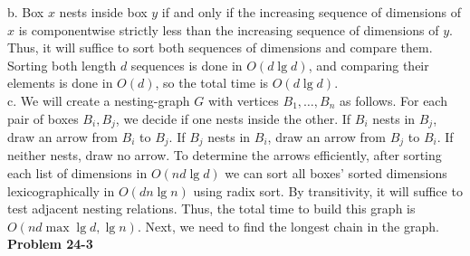 \documentclass{article}
\begin{document}
b. Box $x$ nests inside box $y$ if and only if the increasing sequence of dimensions of $x$ is componentwise strictly less than the increasing sequence of dimensions of $y$.  Thus, it will suffice to sort both sequences of dimensions and compare them.  Sorting both length $d$ sequences is done in $O(d \lg d)$, and comparing their elements is done in $O(d)$, so the total time is $O(d \lg d)$. \\

c. We will create a nesting-graph $G$ with vertices $B_1, \ldots, B_n$ as follows.  For each pair of boxes $B_i, B_j$, we decide if one nests inside the other.  If $B_i$ nests in $B_j$, draw an arrow from $B_i$ to $B_j$.  If $B_j$ nests in $B_i$, draw an arrow from $B_j$ to $B_i$.  If neither nests, draw no arrow.  To determine the arrows efficiently, after sorting each list of dimensions in $O(nd\lg d)$ we can sort all boxes' sorted dimensions lexicographically in $O(dn\lg n)$ using radix sort.  By transitivity, it will suffice to test adjacent nesting relations.  Thus, the total time to build this graph is $O(nd \max{\lg d, \lg n})$.  Next, we need to find the longest chain in the graph.  \\


\noindent\textbf{Problem 24-3}\\
\end{document}
